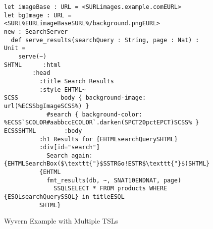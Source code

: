 \documentclass{sig-alternate}
\begin{document}
\begin{figure}[t]
\begin{lstlisting}
let imageBase : URL = <SURLimages.example.comEURL>
let bgImage : URL = <SURL%EURLimageBaseSURL%/background.pngEURL>
new : SearchServer
  def serve_results(searchQuery : String, page : Nat) : Unit =
    serve(~)
SHTML      :html
        :head
          :title Search Results
          :style EHTML~
SCSS            body { background-image: url(%ECSSbgImageSCSS%) }
            #search { background-color: %ECSS`SCOLOR#aabbccECOLOR`.darken(SPCT20pctEPCT)SCSS% }
ECSSSHTML        :body
          :h1 Results for {EHTMLsearchQuerySHTML}
          :div[id="search"]
            Search again: {EHTMLSearchBox($\texttt{"}$SSTRGo!ESTR$\texttt{"}$)SHTML}
          {EHTML
            fmt_results(db, ~, SNAT10ENDNAT, page)
              SSQLSELECT * FROM products WHERE {ESQLsearchQuerySSQL} in titleESQL
          SHTML}
\end{lstlisting}
\vspace{-1px}
\caption{Wyvern Example with Multiple TSLs}
\label{f-example}
\vspace{-10px}
\end{figure}
\end{document}
